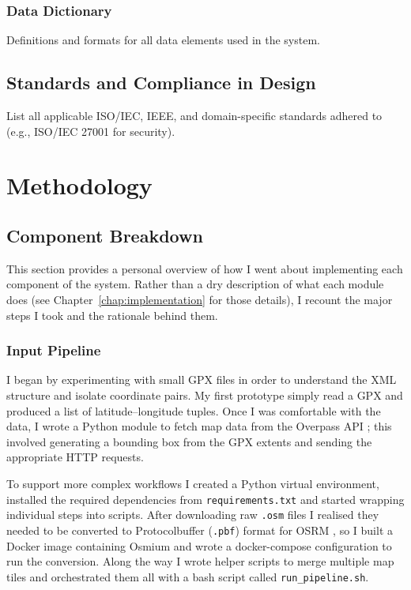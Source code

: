 \documentclass[11pt,twoside]{report}
\begin{document}
\subsection{Data Dictionary}
Definitions and formats for all data elements used in the system.


\section{Standards and Compliance in Design}
List all applicable ISO/IEC, IEEE, and domain-specific standards adhered to (e.g., ISO/IEC 27001 \citep{ISO27001} for security).

\chapter{Methodology}
\label{chap:methodology}

\section{Component Breakdown}
This section provides a personal overview of how I went about implementing each component of the system. Rather than a dry description of what each module does (see Chapter~\ref{chap:implementation} for those details), I recount the major steps I took and the rationale behind them.
\subsection{Input Pipeline}
I began by experimenting with small GPX files in order to understand the XML structure and isolate coordinate pairs. My first prototype simply read a GPX and produced a list of latitude--longitude tuples. Once I was comfortable with the data, I wrote a Python module to fetch map data from the Overpass API \citep{OverpassAPI}; this involved generating a bounding box from the GPX extents and sending the appropriate HTTP requests.

To support more complex workflows I created a Python virtual environment, installed the required dependencies from \texttt{requirements.txt} and started wrapping individual steps into scripts. After downloading raw \texttt{.osm} files I realised they needed to be converted to Protocolbuffer (\texttt{.pbf}) format for OSRM \citep{Luxen2011}, so I built a Docker image containing Osmium \citep{Osmium} and wrote a docker-compose configuration to run the conversion. Along the way I wrote helper scripts to merge multiple map tiles and orchestrated them all with a bash script called \texttt{run\_pipeline.sh}.
\end{document}
